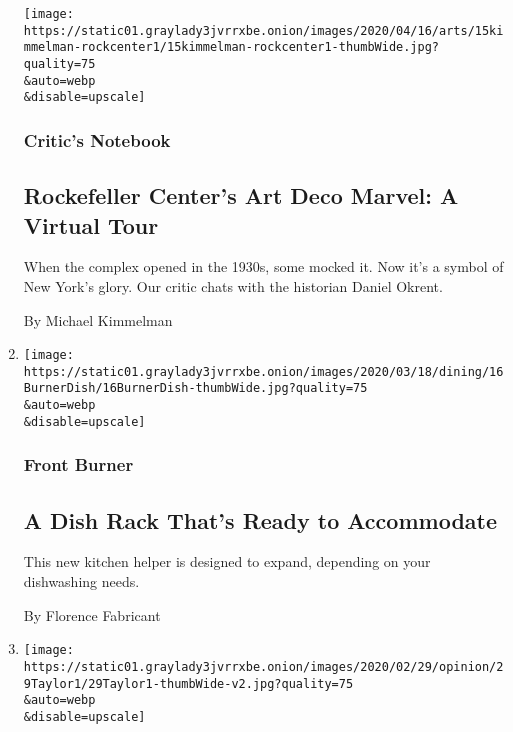 \begin{enumerate}
  \texttt{[image: https://static01.graylady3jvrrxbe.onion/images/2020/04/16/arts/15kimmelman-rockcenter1/15kimmelman-rockcenter1-thumbWide.jpg?quality=75\\\&auto=webp\\\&disable=upscale]}

  \hypertarget{critics-notebook}{%
  \subsubsection{Critic's Notebook}\label{critics-notebook}}

  \hypertarget{rockefeller-centers-art-deco-marvel-a-virtual-tour}{%
  \subsection{Rockefeller Center's Art Deco Marvel: A Virtual
  Tour}\label{rockefeller-centers-art-deco-marvel-a-virtual-tour}}

  When the complex opened in the 1930s, some mocked it. Now it's a
  symbol of New York's glory. Our critic chats with the historian Daniel
  Okrent.

  By Michael Kimmelman
\item
  \href{/2020/03/16/dining/joseph-joseph-dish-rack.html}{}

  \texttt{[image: https://static01.graylady3jvrrxbe.onion/images/2020/03/18/dining/16BurnerDish/16BurnerDish-thumbWide.jpg?quality=75\\\&auto=webp\\\&disable=upscale]}

  \hypertarget{front-burner}{%
  \subsubsection{Front Burner}\label{front-burner}}

  \hypertarget{a-dish-rack-thats-ready-to-accommodate}{%
  \subsection{A Dish Rack That's Ready to
  Accommodate}\label{a-dish-rack-thats-ready-to-accommodate}}

  This new kitchen helper is designed to expand, depending on your
  dishwashing needs.

  By Florence Fabricant
\item
  \href{/2020/02/29/opinion/dorothea-lange-photos.html}{}

  \texttt{[image: https://static01.graylady3jvrrxbe.onion/images/2020/02/29/opinion/29Taylor1/29Taylor1-thumbWide-v2.jpg?quality=75\\\&auto=webp\\\&disable=upscale]}


\end{enumerate}
